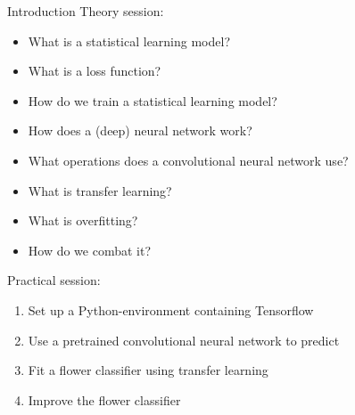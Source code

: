 \documentclass[8pt]{beamer}
\begin{document}
	\begin{frame}{Introduction} %
		\vfill
		Theory session:
		\begin{itemize}
			\item What is a statistical learning model?
			\item What is a loss function?
			\item How do we train a statistical learning model?
			\item How does a (deep) neural network work?
			\item What operations does a convolutional neural network use?
			\item What is transfer learning?
			\item What is overfitting?
			\item How do we combat it?
		\end{itemize}
		Practical session:
		\begin{enumerate}
			\item Set up a Python-environment containing Tensorflow
			\item Use a pretrained convolutional neural network to predict
			\item Fit a flower classifier using transfer learning
			\item Improve the flower classifier
		\end{enumerate}
		\vfill
	\end{frame}
\end{document}
